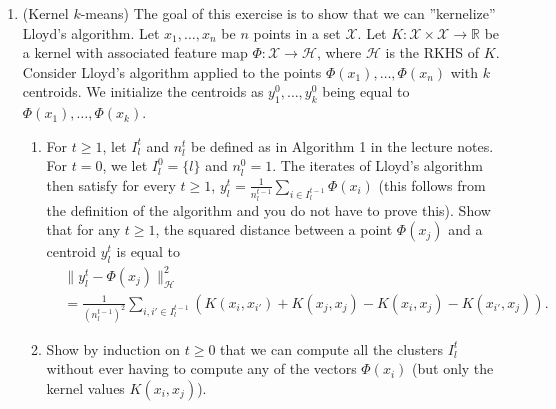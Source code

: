 \documentclass[12pt]{article}
\newcommand{\dotp}[1]{\langle #1 \rangle}
\newcommand{\R}{\mathbb{R}}
\newcommand{\HH}{\mathcal{H}}
\newcommand{\XX}{\mathcal{X}}
\begin{document}
\begin{enumerate}
\item (Kernel $k$-means) The goal of this exercise is to show that we can ''kernelize'' Lloyd's algorithm. Let $x_1,\dots,x_n$ be $n$ points in a set $\XX$. Let $K:\XX\times \XX\to \R$ be a kernel with associated feature map $\Phi:\XX\to \HH$, where $\HH$ is the RKHS of $K$. Consider Lloyd's algorithm applied to the points $\Phi(x_1),\dots,\Phi(x_n)$ with $k$ centroids. We initialize the centroids as $y_1^0,\dots,y_k^0$ being equal to $\Phi(x_1),\dots,\Phi(x_k)$.%
\begin{enumerate}
\item %
For $t\geq 1$, let $I_l^t$ and $n_l^t$ be defined as in Algorithm 1 in the lecture notes. For $t=0$, we let $I_l^0=\{l\}$ and $n_l^0=1$. The iterates of Lloyd's algorithm then satisfy for every $t\geq 1$, $y^t_l=\frac{1}{n_l^{t-1}}\sum_{i\in I_l^{t-1}} \Phi(x_i)$ (this follows from the definition of the algorithm and you do not have to prove this). Show that for any $t\geq 1$, the squared distance between a point $\Phi(x_j)$ and a centroid $y_l^t$ is equal to
\begin{align*}
 &\|y_l^t-\Phi(x_j)\|_\HH^2\\
&= \frac{1}{(n_l^{t-1})^2} \sum_{i,i'\in I_l^{t-1}} (K(x_i,x_{i'})+K(x_j,x_j) - K(x_i,x_j)-K(x_{i'},x_j)).
\end{align*}
\item Show by induction on $t\geq 0$ that we can compute all the clusters $I_l^t$ without ever having to compute any of the vectors $\Phi(x_i)$ (but only the kernel values $K(x_i,x_j)$).
\end{enumerate}


\end{enumerate}
\end{document}
